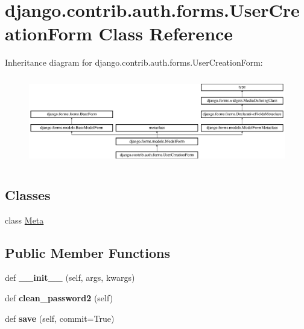 \hypertarget{classdjango_1_1contrib_1_1auth_1_1forms_1_1_user_creation_form}{}\section{django.\+contrib.\+auth.\+forms.\+User\+Creation\+Form Class Reference}
\label{classdjango_1_1contrib_1_1auth_1_1forms_1_1_user_creation_form}
Inheritance diagram for django.\+contrib.\+auth.\+forms.\+User\+Creation\+Form\+:\begin{figure}[H]
\begin{center}
\leavevmode
\includegraphics[height=3.888889cm]{classdjango_1_1contrib_1_1auth_1_1forms_1_1_user_creation_form}
\end{center}
\end{figure}
\subsection*{Classes}
\begin{DoxyCompactItemize}
\item 
class \mbox{\hyperlink{classdjango_1_1contrib_1_1auth_1_1forms_1_1_user_creation_form_1_1_meta}{Meta}}
\end{DoxyCompactItemize}
\subsection*{Public Member Functions}
\begin{DoxyCompactItemize}
\item 
\mbox{\label{classdjango_1_1contrib_1_1auth_1_1forms_1_1_user_creation_form_a071c40cbd643df7e1855e8399374a2ba}} 
def {\bfseries \+\_\+\+\_\+init\+\_\+\+\_\+} (self, args, kwargs)
\item 
\mbox{\label{classdjango_1_1contrib_1_1auth_1_1forms_1_1_user_creation_form_a41f275f3c3a7c0da525443b571321208}} 
def {\bfseries clean\+\_\+password2} (self)
\item 
\mbox{\label{classdjango_1_1contrib_1_1auth_1_1forms_1_1_user_creation_form_a8a926393b31c5dd1cc0b993c84210753}} 
def {\bfseries save} (self, commit=True)
\end{DoxyCompactItemize}
